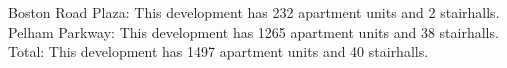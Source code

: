 {Boston Road Plaza}: This development has 232 apartment units and 2 stairhalls.\\{Pelham Parkway}: This development has 1265 apartment units and 38 stairhalls.\\{Total}: This development has 1497 apartment units and 40 stairhalls.\\